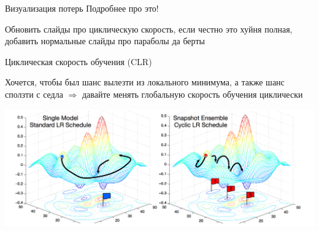 \documentclass[notes,12pt, aspectratio=169]{beamer}
\newenvironment{wideitemize}{\itemize\addtolength{\itemsep}{10pt}}{\enditemize}
\begin{document}
\begin{frame}{Визуализация потерь}
 Подробнее про это!
 
 Обновить слайды про циклическую скорость, если честно это хуйня полная, добавить нормальные слайды про параболы да берты 
\end{frame}


\begin{frame}{Циклическая скорость обучения (CLR)}
	\begin{wideitemize}
		\item Хочется, чтобы был шанс вылезти из локального минимума, а также шанс сползти с седла $\Rightarrow$ давайте менять глобальную скорость обучения циклически
	\end{wideitemize}
	\begin{center}
		\includegraphics[width=0.7\paperwidth]{cycle_sgd.png}
	\end{center}
\end{frame}
\end{document}

